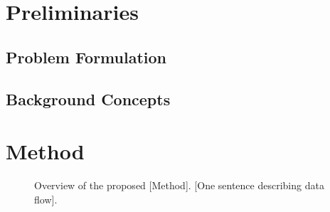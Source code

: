 \documentclass[journal,onecolumn,draftcls]{IEEEtran}
\begin{document}

\section{Preliminaries}
\label{sec:preliminaries}

\subsection{Problem Formulation}
\label{sec:prelim-problem}


\subsection{Background Concepts}
\label{sec:prelim-bg}


\section{Method}
\label{sec:method}


\begin{figure}[t]
  \centering
  \caption{Overview of the proposed [Method]. [One sentence describing data flow].}
  \label{fig:architecture}
\end{figure}
\end{document}
